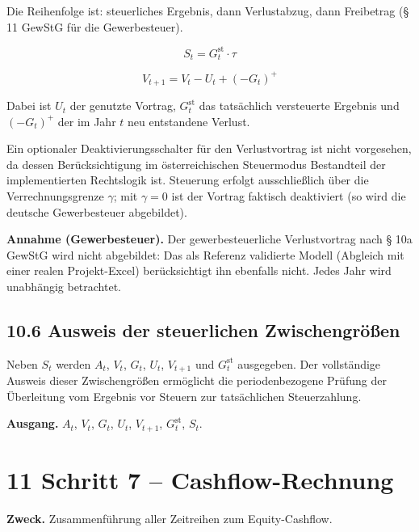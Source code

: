 \documentclass[
  a4paper,
  10pt]{article}
\renewenvironment{quote}
  {\begin{tcolorbox}[
      enhanced,
      breakable,
      colback=Wash,
      colframe=Brand,
      boxrule=0pt,
      leftrule=2.2pt,
      arc=0pt,
      left=8pt,right=8pt,top=6pt,bottom=6pt,
      before skip=8pt,after skip=9pt
    ]\small\color{InkSoft}}
  {\end{tcolorbox}}
\begin{document}
Die Reihenfolge ist: steuerliches Ergebnis, dann Verlustabzug, dann
Freibetrag (§ 11 GewStG für die Gewerbesteuer).

\[ S_t = G^{\mathrm{st}}_t \cdot \tau \]

\[ V_{t+1} = V_t - U_t + \left(-G_t\right)^{+} \]

Dabei ist \(U_t\) der genutzte Vortrag, \(G^{\mathrm{st}}_t\) das
tatsächlich versteuerte Ergebnis und \((-G_t)^{+}\) der im Jahr \(t\)
neu entstandene Verlust.

Ein optionaler Deaktivierungsschalter für den Verlustvortrag ist nicht
vorgesehen, da dessen Berücksichtigung im österreichischen Steuermodus
Bestandteil der implementierten Rechtslogik ist. Steuerung erfolgt
ausschließlich über die Verrechnungsgrenze \(\gamma\); mit
\(\gamma = 0\) ist der Vortrag faktisch deaktiviert (so wird die
deutsche Gewerbesteuer abgebildet).

\begin{quote}
\textbf{Annahme (Gewerbesteuer).} Der gewerbesteuerliche Verlustvortrag
nach § 10a GewStG wird nicht abgebildet: Das als Referenz validierte
Modell (Abgleich mit einer realen Projekt-Excel) berücksichtigt ihn
ebenfalls nicht. Jedes Jahr wird unabhängig betrachtet.
\end{quote}

\hypertarget{ausweis-der-steuerlichen-zwischengruxf6uxdfen}{%
\subsection{10.6 Ausweis der steuerlichen
Zwischengrößen}\label{ausweis-der-steuerlichen-zwischengruxf6uxdfen}}

Neben \(S_t\) werden \(A_t\), \(V_t\), \(G_t\), \(U_t\), \(V_{t+1}\) und
\(G^{\mathrm{st}}_t\) ausgegeben. Der vollständige Ausweis dieser
Zwischengrößen ermöglicht die periodenbezogene Prüfung der Überleitung
vom Ergebnis vor Steuern zur tatsächlichen Steuerzahlung.

\textbf{Ausgang.} \(A_t\), \(V_t\), \(G_t\), \(U_t\), \(V_{t+1}\),
\(G^{\mathrm{st}}_t\), \(S_t\).

\hypertarget{schritt-7-cashflow-rechnung}{%
\section{11 Schritt 7 --
Cashflow-Rechnung}\label{schritt-7-cashflow-rechnung}}

\textbf{Zweck.} Zusammenführung aller Zeitreihen zum Equity-Cashflow.
\end{document}
